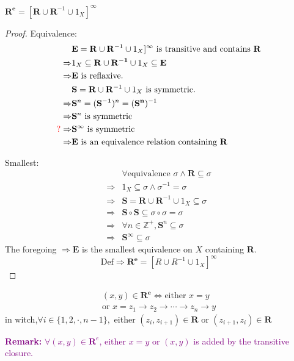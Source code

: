 \begin{Prop}\label{Prop:1.4.9}
    $\mathbf{R^e}=[\mathbf{R} \cup \mathbf{R}^{-1} \cup 1_X]^{\infty}$
    \begin{proof}
        Equivalence: 
        \begin{align*}
            &\mathbf{E}=\mathbf{R} \cup \mathbf{R}^{-1} \cup 1_X]^{\infty} \text{ is transitive and contains } \mathbf{R}    \\
            \Rightarrow& 1_X \subseteq \mathbf{R}\cup \mathbf{R^{-1}}\cup 1_X \subseteq \mathbf{E}   \\
            \Rightarrow& \mathbf{E} \text{ is reflaxive.}  \\
            &\mathbf{S}=\mathbf{R} \cup \mathbf{R}^{-1} \cup 1_X \text{ is symmetric.}  \\
            \Rightarrow& \mathbf{S}^n=(\mathbf{S^{-1}})^n=(\mathbf{S^n})^{-1}   \\
            \Rightarrow& \mathbf{S}^n \text{ is symmetric}  \\
            \textcolor{red}{?}\Rightarrow& \mathbf{S}^{\infty} \text{ is symmetric}   \\
            \Rightarrow& \mathbf{E} \text{ is an equivalence relation containing }\mathbf{R}
        \end{align*}

        Smallest:
        \begin{align*}
            & \forall \text{equivalence } \sigma \wedge \mathbf{R} \subseteq \sigma   \\
            \Rightarrow& 1_X \subseteq \sigma \wedge \sigma^{-1} = \sigma   \\
            \Rightarrow& \mathbf{S}=\mathbf{R} \cup \mathbf{R}^{-1} \cup 1_X \subseteq \sigma \\
            \Rightarrow& \mathbf{S}\circ \mathbf{S} \subseteq \sigma \circ \sigma =\sigma \\
            \Rightarrow& \forall n\in \mathbb{Z}^+, \mathbf{S}^n \subseteq \sigma   \\
            \Rightarrow& \mathbf{S}^{\infty} \subseteq \sigma 
        \end{align*}
        The foregoing $\Rightarrow \mathbf{E}$ is the smallest equivalence on $X$ containing $\mathbf{R}$.
        \[\text{Def}\Rightarrow \mathbf{R^e}=[R\cup R^{-1}\cup 1_X]^{\infty}\]
    \end{proof}
\end{Prop}

\begin{Prop}\label{Prop:1.4.10}
    \begin{align*}
        (x,y)\in \mathbf{R^e} \Leftrightarrow \text{either } x=y    \\
        \text{or } x=z_1\rightarrow z_2\rightarrow \cdots\rightarrow z_n\rightarrow y
    \end{align*}
    in witch,$\forall i \in \{1,2,\cdot,n-1\},$ either $(z_i,z_{i+1})\in \mathbf{R}$ or $(z_{i+1},z_i)\in \mathbf{R}$

    \textcolor{purple}{\textbf{Remark:} $\forall (x,y)\in \mathbf{R}^e$, either $x=y$ or $(x,y)$ is added by the transitive closure.}
\end{Prop}

